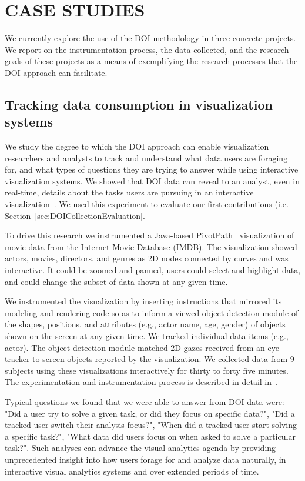 \chapter{CASE STUDIES}
\label{chap:CaseStudies}

We currently explore the use of the DOI methodology in three concrete projects. We report on the instrumentation process, the data collected, and the research goals of these projects as a means of exemplifying the research processes that the DOI approach can facilitate.  

\section{Tracking data consumption in visualization systems}
\label{sec:ExperimentIMDB}
We study the degree to which the DOI approach can enable visualization researchers and analysts to track and understand what data users are foraging for, and what types of questions they are trying to answer while using interactive visualization systems. We showed that DOI data can reveal to an analyst, even in real-time, details about the tasks users are pursuing in an interactive visualization~\cite{Ala16, alam2015they}. We used this experiment to evaluate our first contributions (i.e. Section~\ref{sec:DOICollectionEvaluation}. 

To drive this research we instrumented a Java-based PivotPath~\cite{Dor12} visualization of movie data from the Internet Movie Database (IMDB). The visualization showed actors, movies, directors, and genres as 2D nodes connected by curves and was interactive. It could be zoomed and panned, users could select and highlight data, and could change the subset of data shown at any given time. 

We instrumented the visualization by inserting instructions that mirrored its modeling and rendering code so as to inform a viewed-object detection module of the shapes, positions, and attributes (e.g., actor name, age, gender) of objects shown on the screen at any given time. We tracked individual data items (e.g., actor). The object-detection module matched 2D gazes received from an eye-tracker to screen-objects reported by the visualization. We collected data from $9$ subjects using these visualizations interactively for thirty to forty five minutes. The experimentation and instrumentation process is described in detail in~\cite{Ala16}.

Typical questions we found that we were able to answer from DOI data were: "Did a user try to solve a given task, or did they focus on specific data?", "Did a tracked user switch their analysis focus?", "When did a tracked user start solving a specific task?", "What data did users focus on when asked to solve a particular task?". Such analyses can advance the visual analytics agenda by providing unprecedented insight into how users forage for and analyze data naturally, in interactive visual analytics systems and over extended periods of time. 

